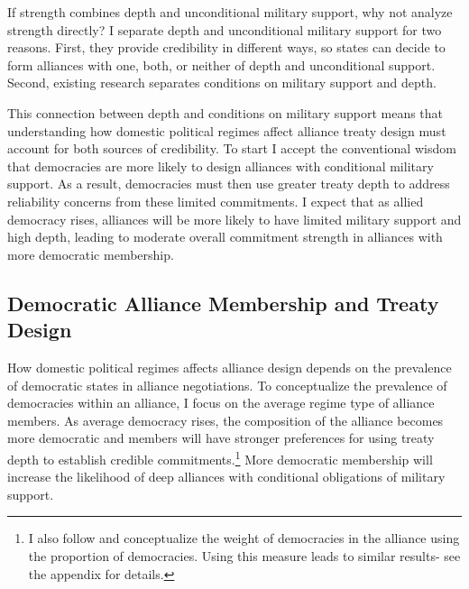 \documentclass[12pt]{article}
\begin{document}
If strength combines depth and unconditional military support, why not analyze strength directly? 
I separate depth and unconditional military support for two reasons. 
First, they provide credibility in different ways, so states can decide to form alliances with one, both, or neither of depth and unconditional support.  
Second, existing research separates conditions on military support and depth. 


This connection between depth and conditions on military support means that understanding how domestic political regimes affect alliance treaty design must account for both sources of credibility.  
To start I accept the conventional wisdom that democracies are more likely to design alliances with conditional military support. 
As a result, democracies must then use greater treaty depth to address reliability concerns from these limited commitments.
I expect that as allied democracy rises, alliances will be more likely to have limited military support and high depth, leading to moderate overall commitment strength in alliances with more democratic membership. 


\subsection{Democratic Alliance Membership and Treaty Design}


How domestic political regimes affects alliance design depends on the prevalence of democratic states in alliance negotiations. 
To conceptualize the prevalence of democracies within an alliance, I focus on the average regime type of alliance members. 
As average democracy rises, the composition of the alliance becomes more democratic and members will have stronger preferences for using treaty depth to establish credible commitments.\footnote{I also follow \citet{Chibaetal2015} and conceptualize the weight of democracies in the alliance using the proportion of democracies. Using this measure leads to similar results- see the appendix for details.} 
More democratic membership will increase the likelihood of deep alliances with conditional obligations of military support. 
\end{document}
